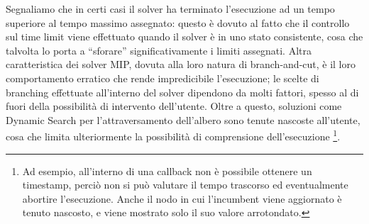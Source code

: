Segnaliamo che in certi casi il solver ha terminato l'esecuzione ad un tempo superiore al tempo massimo assegnato: questo è dovuto al fatto che il controllo sul time limit viene effettuato quando il solver è in uno stato consistente, cosa che talvolta lo porta a ``sforare'' significativamente i limiti assegnati. Altra caratteristica dei solver MIP, dovuta alla loro natura di branch-and-cut, è il loro comportamento erratico che rende impredicibile l'esecuzione; le scelte di branching effettuate all'interno del solver dipendono da molti fattori, spesso al di fuori della possibilità di intervento dell'utente. Oltre a questo, soluzioni come Dynamic Search per l'attraversamento dell'albero sono tenute nascoste all'utente, cosa che limita ulteriormente la possibilità di comprensione dell'esecuzione \footnote{Ad esempio, all'interno di una callback non è possibile ottenere un timestamp, perciò non si può valutare il tempo trascorso ed eventualmente abortire l'esecuzione. Anche il nodo in cui l'incumbent viene aggiornato è tenuto nascosto, e viene mostrato solo il suo valore arrotondato.}.

